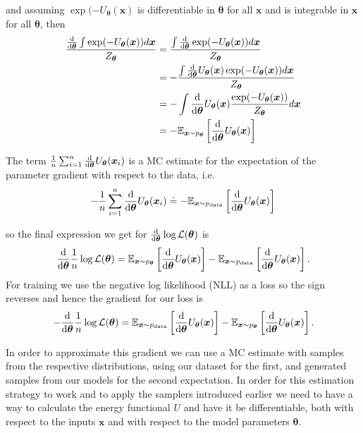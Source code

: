 and assuming $\exp( - U_{\bm{\theta}} (\bm{x})$ is differentiable in $\bm{\theta}$ for all $\bm{x}$ and is integrable in $\bm{x}$ for all $\bm{\theta}$, then
\[
\begin{aligned}
	\frac{\frac{\dif}{\dif \bm{\theta}} \int \exp( - U_{\bm{\theta}} (\bm{x}) ) d\bm{x} }{ Z_{\bm{\theta}} }
	&= \frac{ \int \frac{\dif}{\dif \bm{\theta}} \exp( - U_{\bm{\theta}} (\bm{x}) ) d\bm{x} }{ Z_{\bm{\theta}} } \\
	&= - \frac{ \int \frac{\dif}{\dif \bm{\theta}}U_{\bm{\theta}} (\bm{x}) \exp( - U_{\bm{\theta}} (\bm{x}) ) d\bm{x} }{ Z_{\bm{\theta}} } \\
	&= - \int \frac{\dif}{\dif \bm{\theta}}U_{\bm{\theta}} (\bm{x}) \frac{ \exp( - U_{\bm{\theta}} (\bm{x}) ) }{ Z_{\bm{\theta}} } d\bm{x} \\
	&= - \mathbb{E}_{ \bm{x} \sim p_{\bm{\theta}}} \left[ \frac{\dif}{\dif \bm{\theta}} U_{\bm{\theta}} (\bm{x}) \right] \\
\end{aligned}
\]

The term $\frac{1}{n} \sum_{i=1}^n \frac{\mathop{}\!\mathrm{d}}{\mathop{}\!\mathrm{d} \bm{\theta}} U_{\bm{\theta}} (\bm{x}_i)$ is a MC estimate for the expectation of the parameter gradient 
with respect to the data, i.e.
\[
	- \frac{1}{n} \sum_{i=1}^n \frac{\mathop{}\!\mathrm{d}}{\mathop{}\!\mathrm{d} \bm{\theta}} U_{\bm{\theta}} (\bm{x}_i) 
	\doteq - \mathbb{E}_{ \bm{x} \sim p_{\text{data}} } \left[ \frac{\mathop{}\!\mathrm{d}}{\mathop{}\!\mathrm{d} \bm{\theta}} U_{\bm{\theta}} (\bm{x}) \right]
\]

so the final expression we get for $\frac{\mathop{}\!\mathrm{d}}{\mathop{}\!\mathrm{d} \bm{\theta}} \log \mathcal{L}(\bm{\theta})$ is 
\[
	\frac{\mathop{}\!\mathrm{d}}{\mathop{}\!\mathrm{d} \bm{\theta}} \frac{1}{n} \log \mathcal{L}(\bm{\theta}) = 
	\mathbb{E}_{ \bm{x} \sim p_{\bm{\theta}}} \left[ \frac{\mathop{}\!\mathrm{d}}{\mathop{}\!\mathrm{d} \bm{\theta}} U_{\bm{\theta}} (\bm{x}) \right]
	- \mathbb{E}_{ \bm{x} \sim p_{\text{data}} } \left[ \frac{\mathop{}\!\mathrm{d}}{\mathop{}\!\mathrm{d} \bm{\theta}} U_{\bm{\theta}} (\bm{x}) \right] .
\]
For training we use the negative log likelihood (NLL) as a loss so the sign reverses and hence the gradient for our loss is 
\[
	- \frac{\mathop{}\!\mathrm{d}}{\mathop{}\!\mathrm{d} \bm{\theta}} \frac{1}{n} \log \mathcal{L}(\bm{\theta}) = 
	\mathbb{E}_{ \bm{x} \sim p_{\text{data}} } \left[ \frac{\mathop{}\!\mathrm{d}}{\mathop{}\!\mathrm{d} \bm{\theta}} U_{\bm{\theta}} (\bm{x}) \right] 
	- \mathbb{E}_{ \bm{x} \sim p_{\bm{\theta}}} \left[ \frac{\mathop{}\!\mathrm{d}}{\mathop{}\!\mathrm{d} \bm{\theta}} U_{\bm{\theta}} (\bm{x}) \right] .
\]

In order to approximate this gradient we can use a MC estimate with samples from the respective distributions,
using our dataset for the first, and generated samples from our models for the second expectation.
In order for this estimation strategy to work and to apply the samplers introduced earlier we need to have a way to calculate the energy functional $U$ 
and have it be differentiable, both with respect to the inputs $\bm{x}$ and with respect to the model parameters $\bm{\theta}$.





